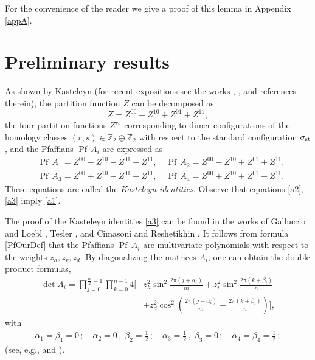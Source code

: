 \documentclass[12pt,reqno]{amsart}
\numberwithin{equation}{section}
\newcommand{\Z}{{\mathbb Z}}
\newcommand{\al}{\alpha}
\newcommand{\be}{\beta}
\newcommand{\sg}{\sigma}
\newcommand{\Pf}{{\operatorname{Pf}\,}}
\begin{document}
For the convenience of the reader we give a proof of this lemma in Appendix \ref{appA}.

\section{Preliminary results} \label{preliminary}

As shown by Kasteleyn \cite{Kas1,Kas3} (for recent expositions see the works \cite{Kenyon}, \cite{McCoy}, \cite{McCoyWu} and references therein), the partition function $Z$ can be decomposed as
\begin{equation}\label{a2}
Z=Z^{00}+Z^{10}+Z^{01}+Z^{11},
\end{equation}
the four partition functions $Z^{rs}$ corresponding to dimer configurations of the homology classes $(r,s)\in \Z_2\oplus\Z_2$ with respect to the standard configuration $\sg_{\rm st}$, 
and the Pfaffians $\Pf A_i$ are expressed as
\begin{equation}\label{a3}
\begin{aligned}
& \Pf A_1=Z^{00}-Z^{10}-Z^{01}-Z^{11}, \quad \Pf A_2=Z^{00}-Z^{10}+Z^{01}+Z^{11}, \\ 
& \Pf A_3=Z^{00}+Z^{10}-Z^{01}+Z^{11}, \quad \Pf A_4=Z^{00}+Z^{10}+Z^{01}-Z^{11}.
\end{aligned}
\end{equation}
These equations are called the {\it Kasteleyn identities}.
Observe that equations \eqref{a2}, \eqref{a3} imply \eqref{a1}.

The proof of the Kasteleyn identities \eqref{a3} can be found in the works of Galluccio and Loebl \cite{GalluLoe}, Tesler \cite{Tes}, and Cimasoni and Reshetikhin \cite{CimResh}. It follows from formula \eqref{PfOurDef} 
that the Pfaffians $\Pf A_i$ are multivariate polynomials with respect to the weights $z_h,z_v,z_d$. By diagonalizing the matrices $A_i$, one can obtain the double product formulas, 
\begin{equation}\label{a5}
\begin{aligned}
\det A_i=\prod_{j=0}^{\frac{m}{2}-1}\prod_{k=0}^{n-1}4\Bigg[&z_h^2\sin^2\frac{2\pi(j+\alpha_i)}{m}+z_v^2\sin^2\frac{2\pi(k+\beta_i)}{n}\\
&+z_d^2\cos^2\left(\frac{2\pi(j+\alpha_i)}{m}+\frac{2\pi(k+\beta_i)}{n}\right)\Bigg],
\end{aligned}
\end{equation}
with
\begin{equation}\label{a6}
\begin{aligned}
\al_1=\be_1=0\,;\quad \al_2=0\,,\;\be_2=\frac{1}{2}\,;\quad\al_3=\frac{1}{2}\,,\;\be_3=0\,;\quad\al_4=\be_4=\frac{1}{2}\,;
\end{aligned}
\end{equation}
(see, e.g., \cite{Fend} and  \cite{IzmaKenna}).
\end{document}
